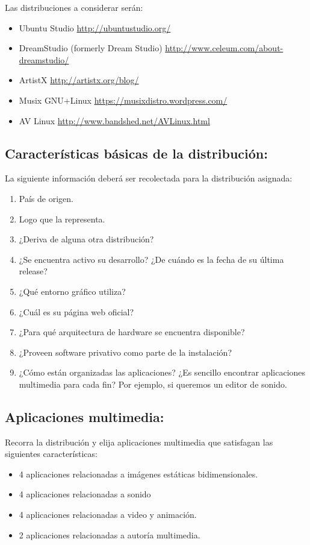\documentclass[12pt]{article}
\begin{document}
Las distribuciones a considerar serán: 
\begin{itemize}
\item Ubuntu Studio \url{http://ubuntustudio.org/}
\item DreamStudio (formerly Dream Studio) \url{http://www.celeum.com/about-dreamstudio/}
\item ArtistX \url{http://artistx.org/blog/}
\item Musix GNU+Linux \url{https://musixdistro.wordpress.com/}
\item AV Linux \url{http://www.bandshed.net/AVLinux.html}
\end{itemize}


\subsection*{Características básicas de la distribución:}

La siguiente información deberá ser recolectada para la distribución asignada: 

\begin{enumerate}
\item País de origen. 
\item Logo que la representa. 
\item ¿Deriva de alguna otra distribución? 
\item ¿Se encuentra activo su desarrollo? ¿De cuándo es la fecha de su última release? 
\item ¿Qué entorno gráfico utiliza?
\item ¿Cuál es su página web oficial?
\item ¿Para qué arquitectura de hardware se encuentra disponible?
\item ¿Proveen software privativo como parte de la instalación? 
\item ¿Cómo están organizadas las aplicaciones? ¿Es sencillo encontrar 
aplicaciones multimedia para cada fin? Por ejemplo, si queremos un editor de sonido.
\end{enumerate}

\subsection*{Aplicaciones multimedia:}
Recorra la distribución y elija aplicaciones multimedia que 
satisfagan las siguientes características: 

\begin{itemize}
\item 4 aplicaciones relacionadas a imágenes estáticas bidimensionales. 
\item 4 aplicaciones relacionadas a sonido
\item 4 aplicaciones relacionadas a video y animación.
\item 2 aplicaciones relacionadas a autoría multimedia. 
\end{itemize}
\end{document}
